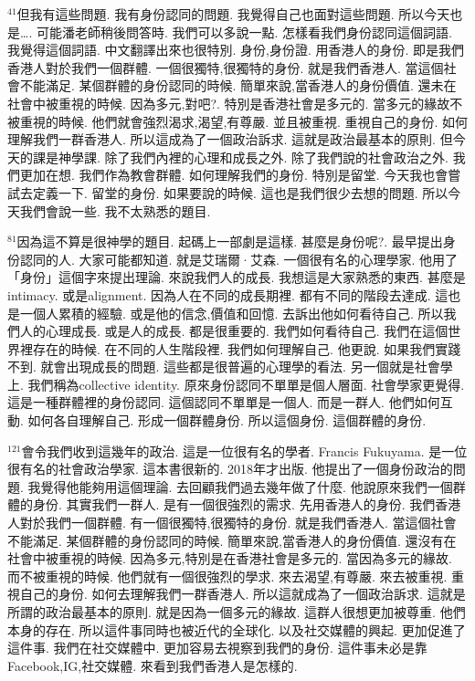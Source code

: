 \documentclass{book}
\begin{document}
$^{41}$但我有這些問題.
我有身份認同的問題.
我覺得自己也面對這些問題.
所以今天也是….
可能潘老師稍後問答時.
我們可以多說一點.
怎樣看我們身份認同這個詞語.
我覺得這個詞語.
中文翻譯出來也很特別.
身份,身份證.
用香港人的身份.
即是我們香港人對於我們一個群體.
一個很獨特,很獨特的身份.
就是我們香港人.
當這個社會不能滿足.
某個群體的身份認同的時候.
簡單來說,當香港人的身份價值.
還未在社會中被重視的時候.
因為多元,對吧?.
特別是香港社會是多元的.
當多元的緣故不被重視的時候.
他們就會強烈渴求,渴望,有尊嚴.
並且被重視.
重視自己的身份.
如何理解我們一群香港人.
所以這成為了一個政治訴求.
這就是政治最基本的原則.
但今天的課是神學課.
除了我們內裡的心理和成長之外.
除了我們說的社會政治之外.
我們更加在想.
我們作為教會群體.
如何理解我們的身份.
特別是留堂.
今天我也會嘗試去定義一下.
留堂的身份.
如果要說的時候.
這也是我們很少去想的問題.
所以今天我們會說一些.
我不太熟悉的題目.

$^{81}$因為這不算是很神學的題目.
起碼上一部劇是這樣.
甚麼是身份呢?.
最早提出身份認同的人.
大家可能都知道.
就是艾瑞爾·艾森.
一個很有名的心理學家.
他用了「身份」這個字來提出理論.
來說我們人的成長.
我想這是大家熟悉的東西.
甚麼是intimacy.
或是alignment.
因為人在不同的成長期裡.
都有不同的階段去達成.
這也是一個人累積的經驗.
或是他的信念,價值和回憶.
去訴出他如何看待自己.
所以我們人的心理成長.
或是人的成長.
都是很重要的.
我們如何看待自己.
我們在這個世界裡存在的時候.
在不同的人生階段裡.
我們如何理解自己.
他更說.
如果我們實踐不到.
就會出現成長的問題.
這些都是很普遍的心理學的看法.
另一個就是社會學上.
我們稱為collective identity.
原來身份認同不單單是個人層面.
社會學家更覺得.
這是一種群體裡的身份認同.
這個認同不單單是一個人.
而是一群人.
他們如何互動.
如何各自理解自己.
形成一個群體身份.
所以這個身份.
這個群體的身份.

$^{121}$會令我們收到這幾年的政治.
這是一位很有名的學者.
Francis Fukuyama.
是一位很有名的社會政治學家.
這本書很新的.
2018年才出版.
他提出了一個身份政治的問題.
我覺得他能夠用這個理論.
去回顧我們過去幾年做了什麼.
他說原來我們一個群體的身份.
其實我們一群人.
是有一個很強烈的需求.
先用香港人的身份.
我們香港人對於我們一個群體.
有一個很獨特,很獨特的身份.
就是我們香港人.
當這個社會不能滿足.
某個群體的身份認同的時候.
簡單來說,當香港人的身份價值.
還沒有在社會中被重視的時候.
因為多元,特別是在香港社會是多元的.
當因為多元的緣故.
而不被重視的時候.
他們就有一個很強烈的學求.
來去渴望,有尊嚴.
來去被重視.
重視自己的身份.
如何去理解我們一群香港人.
所以這就成為了一個政治訴求.
這就是所謂的政治最基本的原則.
就是因為一個多元的緣故.
這群人很想更加被尊重.
他們本身的存在.
所以這件事同時也被近代的全球化.
以及社交媒體的興起.
更加促進了這件事.
我們在社交媒體中.
更加容易去視察到我們的身份.
這件事未必是靠Facebook,IG,社交媒體.
來看到我們香港人是怎樣的.
\end{document}
